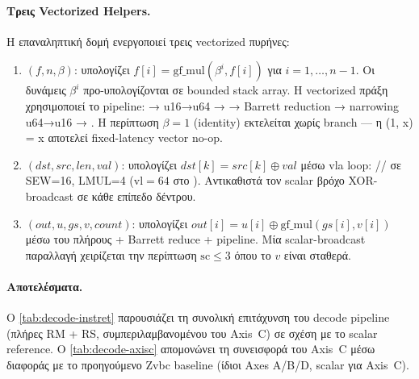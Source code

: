 \paragraph{Τρεις Vectorized Helpers.}
Η επαναληπτική δομή ενεργοποιεί τρεις vectorized πυρήνες:

\begin{enumerate}
  \item \textbf{$(f, n, \beta)$}: υπολογίζει
        $f[i] = \text{gf\_mul}(\beta^i, f[i])$ για $i = 1, \ldots, n-1$.
        Οι δυνάμεις $\beta^i$ προ-υπολογίζονται σε bounded stack array.
        Η vectorized πράξη χρησιμοποιεί το pipeline:  →
         u16→u64 →  → Barrett reduction →
        narrowing u64→u16 → .  Η περίπτωση $\beta = 1$
        (identity) εκτελείται χωρίς branch — η (1, x) = x
        αποτελεί fixed-latency vector no-op.
  \item \textbf{$(dst, src, len, val)$}: υπολογίζει
        $dst[k] = src[k] \oplus val$ μέσω \gls{vla} loop:
        // σε SEW=16, LMUL=4
        ($\text{vl}=64$ στο ).  Αντικαθιστά τον scalar βρόχο
        XOR-broadcast σε κάθε επίπεδο δέντρου.
  \item \textbf{$(out, u, gs, v, count)$}:
        υπολογίζει $out[i] = u[i] \oplus \text{gf\_mul}(gs[i], v[i])$ μέσω
        του πλήρους  + Barrett reduce + 
        pipeline.  Μία scalar-broadcast παραλλαγή χειρίζεται την περίπτωση
        $\text{sc} \leq 3$ όπου το $v$ είναι σταθερά.
\end{enumerate}

\paragraph{Αποτελέσματα.}
Ο \cref{tab:decode-instret} παρουσιάζει τη συνολική επιτάχυνση του decode
pipeline (πλήρες RM + RS, συμπεριλαμβανομένου του Axis~C) σε σχέση με
το scalar reference.  Ο \cref{tab:decode-axisc} απομονώνει τη συνεισφορά
του Axis~C μέσω διαφοράς με το προηγούμενο Zvbc baseline (ίδιοι Axes
A/B/D, scalar  για Axis~C).

\begin{table}[htbp]
  \centering
  \caption{Συνολικό decode pipeline \instret: scalar reference έναντι
           πλήρους \Zvbc υλοποίησης (Axes A+B+C+D).  Μέτρηση σε Spike,
           .}
  \label{tab:decode-instret}
  
\end{table}

